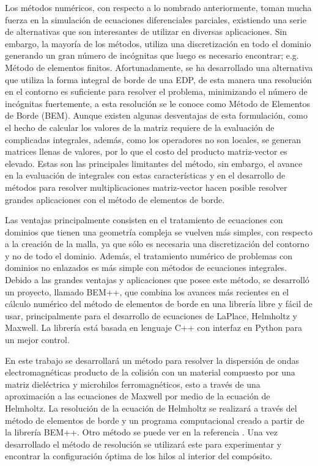 \documentclass[12pt,letterpaper]{article}
\numberwithin{equation}{section}
\begin{document}
Los métodos numéricos, con respecto a lo nombrado anteriormente, toman mucha fuerza en la simulación de ecuaciones diferenciales parciales, existiendo una serie de alternativas que son interesantes de utilizar en diversas aplicaciones. Sin embargo, la mayoría de los métodos, utiliza una discretización en todo el dominio generando un gran número de incógnitas que
luego es necesario encontrar; e.g. Método de elementos finitos. Afortunadamente, se ha desarrollado una alternativa que utiliza la forma integral de borde de una EDP, de esta manera una resolución en el contorno es suficiente para resolver el problema, minimizando el número de incógnitas fuertemente, a esta resolución se le conoce como Método de Elementos de Borde
(BEM). Aunque existen algunas desventajas de esta formulación, como el hecho de calcular los valores de la matriz requiere de la evaluación de complicadas integrales, además, como los operadores no son locales, se generan matrices llenas de valores, por lo que el costo del producto matriz-vector es elevado. Estas son las principales limitantes del método, sin embargo, el avance en la evaluación de integrales con estas características y en el desarrollo de métodos para resolver multiplicaciones matriz-vector hacen posible resolver grandes aplicaciones con el método de elementos de borde. 

Las ventajas principalmente consisten en el tratamiento de ecuaciones con dominios que tienen una geometría compleja se vuelven más simples, con respecto a la creación de la malla, ya que sólo es necesaria una
discretización del contorno y no de todo el dominio. Además, el tratamiento numérico de problemas con dominios no enlazados es más simple con
métodos de ecuaciones integrales. Debido a las grandes ventajas y aplicaciones que posee este método, se desarrolló un proyecto, llamado BEM++, que combina los avances más recientes en el cálculo numérico del método de elementos de borde en una librería libre y fácil de usar, principalmente para el desarrollo de ecuaciones de LaPlace, Helmholtz y Maxwell. La librería está basada en lenguaje C++ con interfaz en Python para un mejor control.

En este trabajo se desarrollará un método para resolver la dispersión de ondas electromagnéticas producto de la colisión con un material compuesto por una matriz dieléctrica y microhilos ferromagnéticos, esto a través de una aproximación a las ecuaciones de Maxwell por medio de la ecuación de Helmholtz. La resolución de la ecuación de Helmholtz se realizará a través del método de elementos de borde y un programa computacional creado a partir de la librería BEM++. Otro método se puede ver en la referencia \cite{Wire_theory_2}. Una vez desarrollado el método de resolución se utilizará este para experimentar y encontrar la configuración óptima de los hilos al interior del compósito. 
\end{document}
